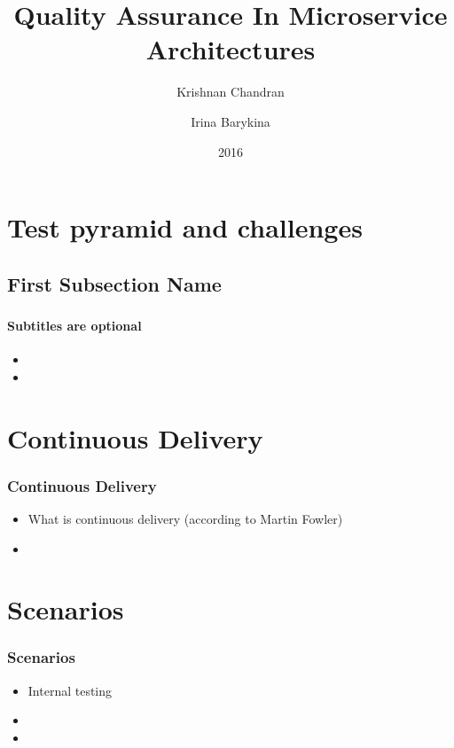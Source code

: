 \documentclass{beamer}
\title{Quality Assurance In Microservice Architectures}
\author{Krishnan Chandran \and Irina Barykina}
\institute[NYU]
{
Department of Informatics,\\
Intelligent Adaptive Systems, UHH\\
}
\date{2016}
\begin{document}
\begin{frame}
\titlepage
\end{frame}


\section{Test pyramid and challenges}
\subsection[Short First Subsection Name]{First Subsection Name}

\begin{frame}
	\frametitle{}	
	\framesubtitle{Subtitles are optional}

	\begin{itemize}
 		 \item
		 \item
	\end{itemize}
\end{frame}


\section{Continuous Delivery}
\begin{frame}
	\frametitle{Continuous Delivery}
	\begin{itemize}
 		 \item What is continuous delivery (according to Martin Fowler)
		 \item 
	\end{itemize}
\end{frame}


\section{Scenarios}
\begin{frame}
	\frametitle{Scenarios}
	\begin{itemize}
 		 \item Internal testing
		 \item
		 \item
	\end{itemize}
\end{frame}
\end{document}
